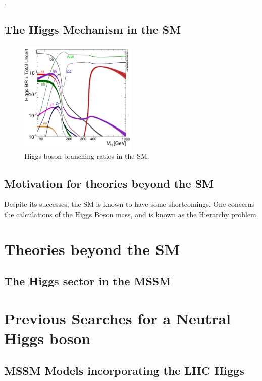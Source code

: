 \cite{GlashowPartialSymmetries,WeinbergModelOfLeptons,SalamNobelSymposium}.

\subsection{The Higgs Mechanism in the \ac{SM}}
\label{sec:SMHiggs}


\begin{figure}[htbp]
   \includegraphics[width=0.5\textwidth]{plots/theory/Higgs_BR.pdf}
\caption{Higgs boson branching ratios in the \ac{SM}\cite{}.}
\label{fig:SMHiggsBRs}
\end{figure}


\subsection{Motivation for theories beyond the \ac{SM}}

Despite its successes, the \ac{SM} is known to have some shortcomings. One concerns
the calculations of the Higgs Boson mass, and is known as the Hierarchy problem. 

\section{Theories beyond the SM}
\label{sec:BSM}

\subsection{The Higgs sector in the MSSM}
\label{sec:mssmhiggs}

\section{Previous Searches for a Neutral Higgs boson}
\label{sec:previoussearches}

\subsection{MSSM Models incorporating the LHC Higgs}
\label{sec:mssmbenchmarks}

